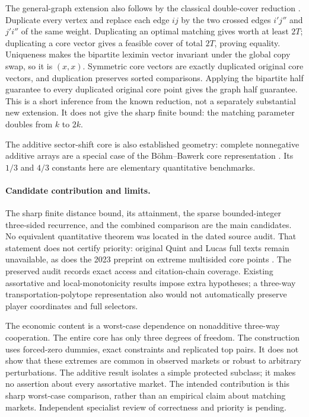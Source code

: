 \documentclass[11pt]{article}
\begin{document}
The general-graph extension also follows by the classical double-cover
reduction \cite{biro}. Duplicate every vertex and replace each edge $ij$ by
the two crossed edges $i'j''$ and $j'i''$ of the same weight. Duplicating
an optimal matching gives worth at least $2T$; duplicating a core vector
gives a feasible cover of total $2T$, proving equality. Uniqueness makes the
bipartite leximin vector invariant under the global copy swap, so it is
$(x,x)$. Symmetric core vectors are exactly duplicated original core
vectors, and duplication preserves sorted comparisons. Applying the
bipartite half guarantee to every duplicated original core point gives
the graph half guarantee. This is a short inference from the known
reduction, not a separately substantial new extension. It does not give
the sharp finite bound: the matching parameter doubles from $k$ to $2k$.

The additive sector-shift core is also established geometry: complete
nonnegative additive arrays are a special case of the B\"ohm--Bawerk
core representation \cite{tejada}. Its $1/3$ and $4/3$ constants here are
elementary quantitative benchmarks.

\paragraph{Candidate contribution and limits.}
The sharp finite distance bound, its attainment, the sparse bounded-integer
three-sided recurrence, and the combined comparison are the main candidates.
No equivalent quantitative theorem was located in the dated source audit.
That statement does not certify priority: original Quint and Lucas full texts
remain unavailable, as does the 2023 preprint on extreme multisided core
points \cite{extreme2023}. The preserved audit records exact access and
citation-chain coverage. Existing assortative and local-monotonicity results impose
extra hypotheses; a three-way transportation-polytope representation also
would not automatically preserve player coordinates and full selectors.

The economic content is a worst-case dependence on nonadditive three-way
cooperation. The entire core has only three degrees of freedom.
The construction uses forced-zero dummies, exact constraints and
replicated top pairs. It does not show that these extremes are common in
observed markets or robust to arbitrary perturbations. The additive result
isolates a simple protected subclass; it makes no assertion about every
assortative market. The intended contribution is this sharp worst-case comparison, rather than
an empirical claim about matching markets. Independent specialist review of
correctness and priority is pending.
\end{document}
